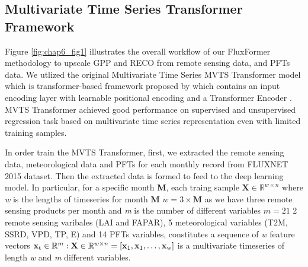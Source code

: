 \subsection{Multivariate Time Series Transformer Framework}
Figure \ref{fig:chap6_fig1} illustrates the overall workflow of our FluxFormer methodology to upscale GPP and RECO from remote sensing data, and PFTs data. We utlized the original Multivariate Time Series MVTS Transformer model which is transformer-based framework proposed by \citep{zerveas2021transformer} which contains an input encoding layer with learnable positional encoding and a Transformer Encoder \citep{vaswani2017attention}. MVTS Transformer achieved good performance on supervised and unsupervised regression task based on multivariate time series representation even with limited training samples.  \par
In order train the MVTS Transformer, first, we extracted the remote sensing data, meteorological data and PFTs for each monthly record from FLUXNET 2015 dataset. Then the extracted data is formed to feed to the deep learning model. In particular, for a specific month \textbf{M}, each traing sample $\mathbf{X} \in \mathbb{R}^{w\times n}$ where \textit{w} is the lengths of timeseries for month \textbf{M} $\textit{w} = 3\times \textbf{M}$ as we have three remote sensing products per month and \textit{m} is the number of different variables  $\textit{m} = 21$ 2 remote sensing varibales (LAI and FAPAR), 5 meteorological variables (T2M, SSRD, VPD, TP, E) and 14 PFTs variables, constitutes a sequence of \textit{w} feature vectors $\mathbf{x}\textsubscript{t} \in \mathbb{R}^{m}: \mathbf{X} \in \mathbb{R}^{w\times n} = [\mathbf{x}\textsubscript{1},\mathbf{x}\textsubscript{1}, \dots, \mathbf{x}\textsubscript{w}]$ is a multivariate timeseries of length \textit{w} and \textit{m} different variables. \par

